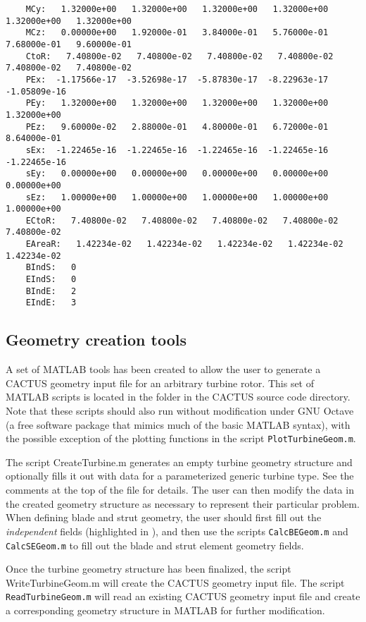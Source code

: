 \begin{lstlisting}
    MCy:   1.32000e+00   1.32000e+00   1.32000e+00   1.32000e+00   1.32000e+00   1.32000e+00 
    MCz:   0.00000e+00   1.92000e-01   3.84000e-01   5.76000e-01   7.68000e-01   9.60000e-01 
    CtoR:   7.40800e-02   7.40800e-02   7.40800e-02   7.40800e-02   7.40800e-02   7.40800e-02 
    PEx:  -1.17566e-17  -3.52698e-17  -5.87830e-17  -8.22963e-17  -1.05809e-16 
    PEy:   1.32000e+00   1.32000e+00   1.32000e+00   1.32000e+00   1.32000e+00 
    PEz:   9.60000e-02   2.88000e-01   4.80000e-01   6.72000e-01   8.64000e-01 
    sEx:  -1.22465e-16  -1.22465e-16  -1.22465e-16  -1.22465e-16  -1.22465e-16 
    sEy:   0.00000e+00   0.00000e+00   0.00000e+00   0.00000e+00   0.00000e+00 
    sEz:   1.00000e+00   1.00000e+00   1.00000e+00   1.00000e+00   1.00000e+00 
    ECtoR:   7.40800e-02   7.40800e-02   7.40800e-02   7.40800e-02   7.40800e-02 
    EAreaR:   1.42234e-02   1.42234e-02   1.42234e-02   1.42234e-02   1.42234e-02 
    BIndS:   0 
    EIndS:   0 
    BIndE:   2 
    EIndE:   3
\end{lstlisting}

\subsection{Geometry creation tools}
\label{sec:geomery_creation_tools}
A set of MATLAB tools has been created to allow the user to generate a CACTUS geometry input file for an arbitrary turbine rotor. This set of MATLAB scripts is located in the  folder in the CACTUS source code directory. Note that these scripts should also run without modification under GNU Octave (a free software package that mimics much of the basic MATLAB syntax), with the possible exception of the plotting functions in the script \texttt{PlotTurbineGeom.m}.

The script CreateTurbine.m generates an empty turbine geometry structure and optionally fills it out with data for a parameterized generic turbine type. See the comments at the top of the file for details. The user can then modify the data in the created geometry structure as necessary to represent their particular problem. When defining blade and strut geometry, the user should first fill out the \emph{independent} fields (highlighted in ), and then use the scripts \texttt{CalcBEGeom.m} and \texttt{CalcSEGeom.m} to fill out the blade and strut element geometry fields.

Once the turbine geometry structure has been finalized, the script WriteTurbineGeom.m will create the CACTUS geometry input file. The script \texttt{ReadTurbineGeom.m} will read an existing CACTUS geometry input file and create a corresponding geometry structure in MATLAB for further modification.

